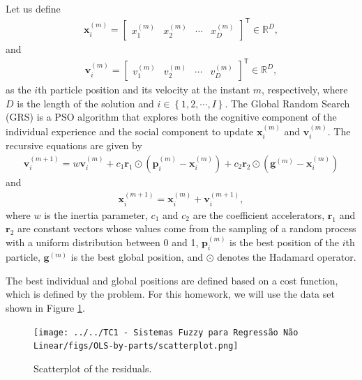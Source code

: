 \documentclass[12pt,a4paper]{article}
\newcommand{\trans}{\mathsf{T}}
\newcommand{\Real}{\mathbb{R}}
\begin{document}
Let us define
\begin{align}
    \mathbf{x}_i^{(m)} = \begin{bmatrix}
        x_1^{(m)} & x_2^{(m)} & \cdots & x_D^{(m)}
    \end{bmatrix}^\trans \in \Real^D,
\end{align}
and
\begin{align}
    \mathbf{v}_i^{(m)} = \begin{bmatrix}
        v_1^{(m)} & v_2^{(m)} & \cdots & v_D^{(m)}
    \end{bmatrix}^\trans \in \Real^D,
\end{align}
as the \(i\)th particle position and its velocity at the instant \(m\), respectively, where \(D\) is the length of the solution and \(i \in \left\{ 1, 2, \cdots, I \right\}\). The Global Random Search (GRS) is a PSO algorithm that explores both the cognitive component of the individual experience and the social component to update \(\mathbf{x}_i^{(m)}\) and \(\mathbf{v}_i^{(m)}\). The recursive equations are given by
\begin{align}
    \mathbf{v}_i^{(m+1)} = w\mathbf{v}_i^{(m)} + c_1 \mathbf{r}_1 \odot \left( \mathbf{p}_i^{(m)} - \mathbf{x}_i^{(m)} \right) + c_2 \mathbf{r}_2 \odot \left( \mathbf{g}^{(m)} - \mathbf{x}_i^{(m)} \right)
\end{align}
and
\begin{align}
    \mathbf{x}_i^{(m+1)} = \mathbf{x}_i^{(m)} + \mathbf{v}_i^{(m+1)},
\end{align}
where \(w\) is the inertia parameter, \(c_1\) and \(c_2\) are the coefficient accelerators, \(\mathbf{r}_1\) and \(\mathbf{r}_2\) are constant vectors whose values come from the sampling of a random process with a uniform distribution between 0 and 1, \(\mathbf{p}_i^{(m)}\) is the best position of the \(i\)th particle, \(\mathbf{g}^{(m)}\) is the best global position, and \(\odot\) denotes the Hadamard operator.

The best individual and global positions are defined based on a cost function, which is defined by the problem. For this homework, we will use the data set shown in Figure \ref{fig:scatter-plot}.
\begin{figure}[H]
    \centering
    \texttt{[image: ../../TC1 - Sistemas Fuzzy para Regressão Não Linear/figs/OLS-by-parts/scatterplot.png]}
    \caption{Scatterplot of the residuals.}
    \label{fig:scatter-plot}
\end{figure}
\end{document}
